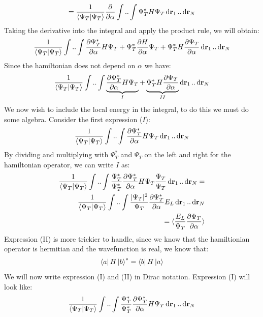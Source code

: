 \documentclass[a4paper, 10pt]{article}
\begin{document}
\begin{appendices}
\begin{align}
=
\frac{1}{\braket{\Psi_{T}}}\pdv{\alpha}\int..\int\Psi_{T}^{*}H\Psi_{T}\dd{\bold{r}_{1}}..\dd{\bold{r}_{N}}
\end{align}
Taking the derivative into the integral and apply the product rule, we will obtain:
\begin{align}
\frac{1}{\braket{\Psi_{T}}}\int..\int\pdv{\Psi_{T}^{*}}{\alpha}H\Psi_{T}
+   \Psi_{T}^{*}\pdv{H}{\alpha}\Psi_{T}
+   \Psi_{T}^{*}H\pdv{\Psi_{T}}{\alpha}\dd{\bold{r}_{1}}..\dd{\bold{r}_{N}}
\end{align}
Since the hamiltonian does not depend on $\alpha$ we have:
\begin{align}
\frac{1}{\braket{\Psi_{T}}}\int..\int\underbrace{\pdv{\Psi_{T}^{*}}{\alpha}H\Psi_{T}}_{I}
+   \underbrace{\Psi_{T}^{*}H\pdv{\Psi_{T}}{\alpha}}_{II}\dd{\bold{r}_{1}}..\dd{\bold{r}_{N}}
\end{align}
We now wish to include the local energy in the integral, to do this we must
do some algebra. Consider the first expression ($I$):
\begin{align}
\frac{1}{\braket{\Psi_{T}}}\int..\int \pdv{\Psi_{T}^{*}}{\alpha}H\Psi_{T}\dd{\bold{r}_{1}}..\dd{\bold{r}_{N}}
\end{align}
By dividing and multiplying with $\Psi_{T}^{*}$ and $\Psi_{T}$ on the left and right for the
hamiltonian operator, we can write $I$ as:
\begin{align}
\begin{split}
\frac{1}{\braket{\Psi_{T}}}\int..\int \frac{\Psi_{T}^{*}}{\Psi_{T}^{*}}\pdv{\Psi_{T}^{*}}{\alpha}H\Psi_{T}\frac{\Psi_{T}}{\Psi_{T}}\dd{\bold{r}_{1}}..\dd{\bold{r}_{N}}
=
\\
\frac{1}{\braket{\Psi_{T}}}\int..\int \frac{|\Psi_{T}|^{2}}{\Psi_{T}}\pdv{\Psi_{T}^{*}}{\alpha}E_{L}\dd{\bold{r}_{1}}..\dd{\bold{r}_{N}}
\\
= \langle \frac{E_{L}}{\Psi_{T}}\pdv{\Psi_{T}}{\alpha}\rangle
\label{result1}
\end{split}
\end{align}
Expression (II) is more trickier to handle, since we know that the hamiltionian
operator is hermitian and the wavefunction is real, we know that:
\begin{align}
\bra{a}H\ket{b}^{*} = \bra{b}H\ket{a}
\end{align}
We will now write expression (I) and (II) in Dirac notation. Expression (I) will
look like:
\begin{align}
\frac{1}{\braket{\Psi_{T}}}\int..\int \frac{\Psi_{T}^{*}}{\Psi_{T}^{*}}\pdv{\Psi_{T}^{*}}{\alpha}H\Psi_{T}\dd{\bold{r}_{1}}..\dd{\bold{r}_{N}}

\end{align}
\end{appendices}
\end{document}
